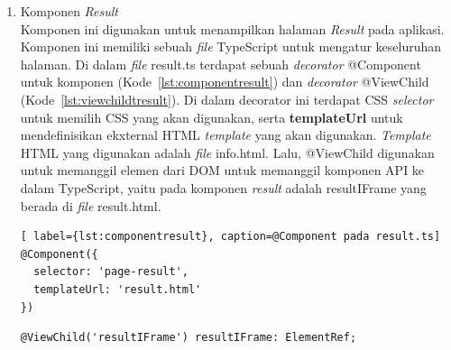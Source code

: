 \begin{enumerate}
\begin{itemize}
		\item \textit{Content} \\
		\textit{Content} pada halaman info memiliki \textit{tag} \texttt{<ion-content>} (Kode~\ref{lst:contentInfo}) yang pada gambar~\ref{fig:InfoPageWireframe} dengan kotak berwarna merah. Di dalam \textit{tag} info terdapat \textit{tag} \texttt{<ion-grid>} untuk mengatur \textit{layout} dari \textit{content}. Di dalam \textit{tag} \texttt{<ion-grid>} terdapat sebuah \textit{tag} \texttt{<ion-row>} yang berisi sebuah \textit{tag} \texttt{<div>}. \textit{Tag} tersebut berisi info yang di dapatkan pada \textit{constructor} di \textit{file} info.ts.

\begin{lstlisting}[label={lst:contentInfo}, caption=\textit{Content} pada info.html]
<ion-content>
  <ion-grid>
    <ion-row>
      <div [innerHTML]=wsdcInfoData>
      </div>
    </ion-row>
  </ion-grid>
</ion-content>
\end{lstlisting} 
	\end{itemize}
	
	\item Komponen \textit{Result} \\
	Komponen ini digunakan untuk menampilkan halaman \textit{Result} pada aplikasi. Komponen ini memiliki sebuah \textit{file} TypeScript untuk mengatur keseluruhan halaman. Di dalam \textit{file} result.ts terdapat sebuah \textit{decorator} @Component untuk komponen (Kode~\ref{lst:componentresult}) dan \textit{decorator} @ViewChild (Kode~\ref{lst:viewchildtresult}). Di dalam decorator ini terdapat CSS \textit{selector} untuk memilih CSS yang akan digunakan, serta \textbf{templateUrl} untuk mendefinisikan ekxternal HTML \textit{template} yang akan digunakan. \textit{Template} HTML yang digunakan adalah \textit{file} info.html. Lalu, @ViewChild digunakan untuk memanggil elemen dari DOM untuk memanggil komponen API ke dalam TypeScript, yaitu pada komponen \textit{result} adalah resultIFrame yang berada di \textit{file} result.html.
	
\begin{lstlisting}[ label={lst:componentresult}, caption=@Component pada result.ts]
@Component({
  selector: 'page-result',
  templateUrl: 'result.html'
})
\end{lstlisting} 

\begin{lstlisting}[label={lst:viewchildtresult}, caption=@ViewChild pada result.ts]
@ViewChild('resultIFrame') resultIFrame: ElementRef;
\end{lstlisting} 


\end{enumerate}

